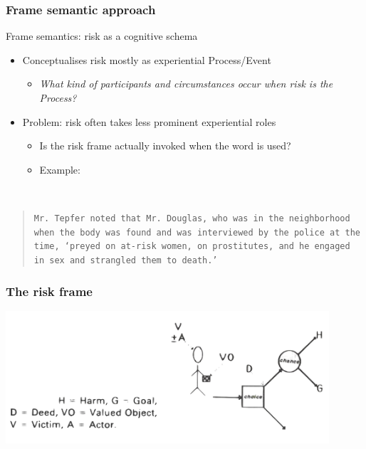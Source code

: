 \documentclass{beamer}       %
\begin{document}
\begin{frame}
    \frametitle{Frame semantic approach}

    Frame semantics: risk as a cognitive schema \cite{fillmore_toward_1992}

\begin{itemize}
    \item Conceptualises risk mostly as experiential Process\slash Event
    \begin{itemize}
        \item \emph{What kind of participants and circumstances occur when risk is the Process?}
    \end{itemize}
    \item Problem: risk often takes less prominent experiential roles
    \begin{itemize}
        \item Is the risk frame actually invoked when the word is used?
        \item Example:
    \end{itemize}
    \end{itemize}

    ~\\
    \footnotesize
    \begin{quote}
    \noindent
    \texttt{Mr. Tepfer noted that Mr. Douglas, who was in the neighborhood when the body was found and was interviewed by the police at the time, `preyed on \textbf{at-risk women}, on prostitutes, and he engaged in sex and strangled them to death.' }
    \end{quote}

\end{frame}

\begin{frame}
    \frametitle{The risk frame}
    \centering
    \includegraphics[width=0.90\textwidth]{../../images/riskframe.png}
\end{frame}
\end{document}
